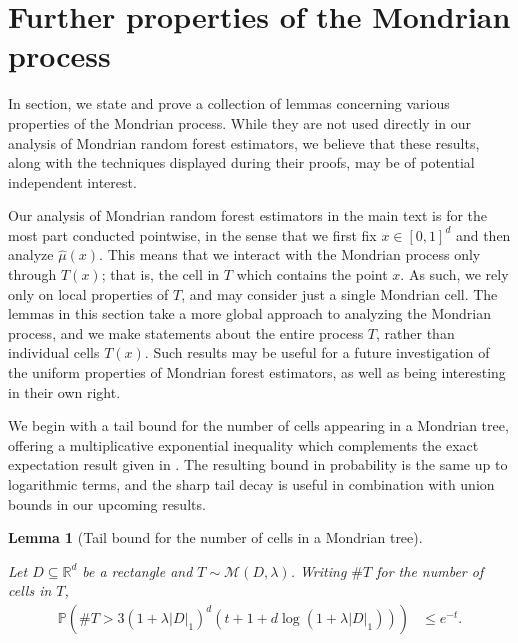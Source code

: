\documentclass[11pt,lof]{puthesis}
\renewcommand{\P}{\ensuremath{\mathbb{P}}}
\newcommand{\R}{\ensuremath{\mathbb{R}}}
\newcommand{\cM}{\ensuremath{\mathcal{M}}}
\theoremstyle{break}
\newtheorem{lemma}{Lemma}[section]
\theoremstyle{proof}
\begin{document}
\section{Further properties of the Mondrian process}

In section, we state and prove a collection of lemmas concerning
various properties of the Mondrian process. While they are not used directly
in our analysis of Mondrian random forest estimators, we believe that
these results, along with the techniques displayed during their proofs,
may be of potential independent interest.

Our analysis of Mondrian random forest estimators in the main text
is for the most part
conducted pointwise, in the sense that we first fix $x \in [0,1]^d$
and then analyze $\hat\mu(x)$. This means that we interact with the Mondrian
process
only through $T(x)$; that is, the cell in $T$ which contains the point $x$.
As such, we rely only on local properties of $T$, and may consider just a
single Mondrian cell. The lemmas in this section take a more global approach
to analyzing the Mondrian process, and we make statements about the
entire process $T$, rather than individual cells $T(x)$.
Such results may be useful for a future investigation of the uniform
properties of Mondrian forest estimators, as well as
being interesting in their own right.

We begin with a tail bound for the number of cells appearing
in a Mondrian tree, offering a multiplicative
exponential inequality which
complements the exact expectation result given in
\citet[Proposition~2]{mourtada2020minimax}.
The resulting bound in probability is the same up to
logarithmic terms, and the sharp tail decay is useful
in combination with union bounds in our upcoming results.

\begin{lemma}[Tail bound for the number of cells in a Mondrian tree]
\label{lem:mondrian_app_cells_tail}

Let $D \subseteq \R^d$ be a rectangle and
$T \sim \cM(D, \lambda)$. Writing
$\# T$ for the number of cells in $T$,
%
\begin{align*}
\P\left(
\# T > 3 (1 + \lambda |D|_1)^d
(t + 1 + d \log(1 + \lambda |D|_1))
\right)
&\leq
e^{-t}.
\end{align*}

\end{lemma}
\end{document}
